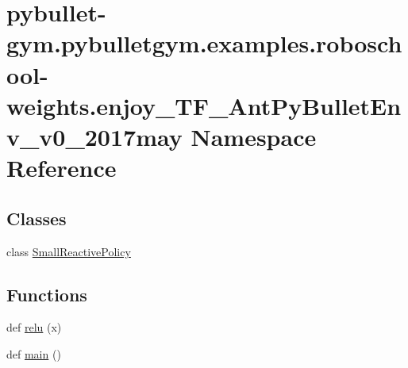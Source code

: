 \hypertarget{namespacepybullet-gym_1_1pybulletgym_1_1examples_1_1roboschool-weights_1_1enjoy___t_f___ant_py_bullet_env__v0__2017may}{}\section{pybullet-\/gym.pybulletgym.\+examples.\+roboschool-\/weights.enjoy\+\_\+\+T\+F\+\_\+\+Ant\+Py\+Bullet\+Env\+\_\+v0\+\_\+2017may Namespace Reference}
\label{namespacepybullet-gym_1_1pybulletgym_1_1examples_1_1roboschool-weights_1_1enjoy___t_f___ant_py_bullet_env__v0__2017may}
\subsection*{Classes}
\begin{DoxyCompactItemize}
\item 
class \hyperlink{classpybullet-gym_1_1pybulletgym_1_1examples_1_1roboschool-weights_1_1enjoy___t_f___ant_py_bulle5ecb47f8263227605726aaf04ad2d6e8}{Small\+Reactive\+Policy}
\end{DoxyCompactItemize}
\subsection*{Functions}
\begin{DoxyCompactItemize}
\item 
def \hyperlink{namespacepybullet-gym_1_1pybulletgym_1_1examples_1_1roboschool-weights_1_1enjoy___t_f___ant_py_bullet_env__v0__2017may_a702a1b329d0eb59bd4be7177fd0cc6f6}{relu} (x)
\item 
def \hyperlink{namespacepybullet-gym_1_1pybulletgym_1_1examples_1_1roboschool-weights_1_1enjoy___t_f___ant_py_bullet_env__v0__2017may_a6aa96132e6c3a2ac1f8a772f0e00f85a}{main} ()
\end{DoxyCompactItemize}
